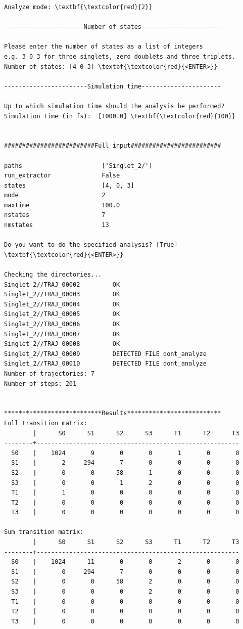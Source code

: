 \documentclass[a4paper,11pt,DIV=15,openany]{scrbook}
\begin{document}
\begin{oframed}
\begin{Verbatim}[commandchars=\\\{\}]
Analyze mode: \textbf{\textcolor{red}{2}}

----------------------Number of states----------------------

Please enter the number of states as a list of integers
e.g. 3 0 3 for three singlets, zero doublets and three triplets.
Number of states: [4 0 3] \textbf{\textcolor{red}{<ENTER>}}

-----------------------Simulation time----------------------

Up to which simulation time should the analysis be performed?
Simulation time (in fs):  [1000.0] \textbf{\textcolor{red}{100}}


#########################Full input#########################

paths                      ['Singlet_2/']
run_extractor              False
states                     [4, 0, 3]
mode                       2
maxtime                    100.0
nstates                    7
nmstates                   13

Do you want to do the specified analysis? [True] \textbf{\textcolor{red}{<ENTER>}}

Checking the directories...
Singlet_2//TRAJ_00002         OK
Singlet_2//TRAJ_00003         OK
Singlet_2//TRAJ_00004         OK
Singlet_2//TRAJ_00005         OK
Singlet_2//TRAJ_00006         OK
Singlet_2//TRAJ_00007         OK
Singlet_2//TRAJ_00008         OK
Singlet_2//TRAJ_00009         DETECTED FILE dont_analyze
Singlet_2//TRAJ_00010         DETECTED FILE dont_analyze
Number of trajectories: 7
Number of steps: 201


***************************Results**************************
Full transition matrix:
        |      S0      S1      S2      S3      T1      T2      T3
--------+--------------------------------------------------------
  S0    |    1024       9       0       0       1       0       0
  S1    |       2     294       7       0       0       0       0
  S2    |       0       0      58       1       0       0       0
  S3    |       0       0       1       2       0       0       0
  T1    |       1       0       0       0       0       0       0
  T2    |       0       0       0       0       0       0       0
  T3    |       0       0       0       0       0       0       0

Sum transition matrix:
        |      S0      S1      S2      S3      T1      T2      T3
--------+--------------------------------------------------------
  S0    |    1024      11       0       0       2       0       0
  S1    |       0     294       7       0       0       0       0
  S2    |       0       0      58       2       0       0       0
  S3    |       0       0       0       2       0       0       0
  T1    |       0       0       0       0       0       0       0
  T2    |       0       0       0       0       0       0       0
  T3    |       0       0       0       0       0       0       0


\end{Verbatim}
\end{oframed}
\end{document}
